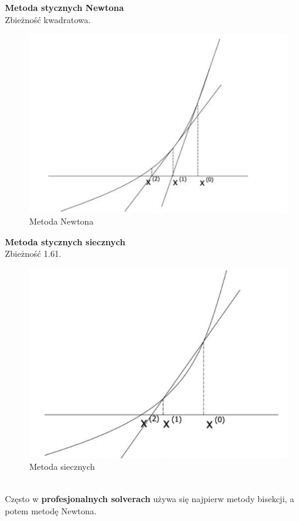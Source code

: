 \documentclass[12pt]{article}
\begin{document}
\textbf{Metoda stycznych Newtona}\\
Zbieżność kwadratowa.
\begin{figure}[H]
	\centering
	\includegraphics[scale=0.7]{Pictures/metoda_stycznych_newtona}
	\caption{Metoda Newtona}
\end{figure}

\textbf{Metoda stycznych siecznych}\\
Zbieżność 1.61.
\begin{figure}[H]
	\centering
	\includegraphics[scale=0.7]{Pictures/metoda_siecznych}
	\caption{Metoda siecznych}
\end{figure}
~\\
Często w \textbf{profesjonalnych solverach} używa się najpierw metody bisekcji, a potem metodę Newtona.
\end{document}

